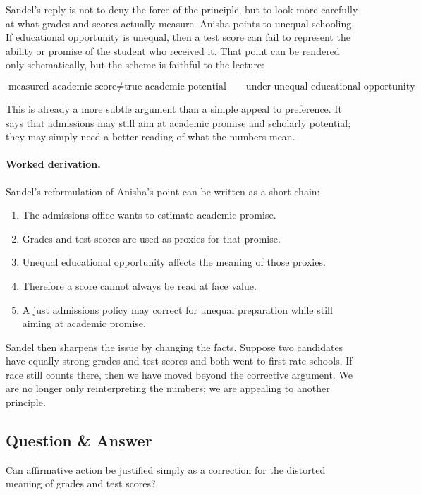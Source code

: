 Sandel's reply is not to deny the force of the principle, but to look more carefully at what grades and scores actually measure. Anisha points to unequal schooling. If educational opportunity is unequal, then a test score can fail to represent the ability or promise of the student who received it. That point can be rendered only schematically, but the scheme is faithful to the lecture:

\begin{equation}
\text{measured academic score} \neq \text{true academic potential}
\qquad
\text{under unequal educational opportunity}
\end{equation}

This is already a more subtle argument than a simple appeal to preference. It says that admissions may still aim at academic promise and scholarly potential; they may simply need a better reading of what the numbers mean.

\paragraph{Worked derivation.} Sandel's reformulation of Anisha's point can be written as a short chain:
\begin{enumerate}
\item The admissions office wants to estimate academic promise.
\item Grades and test scores are used as proxies for that promise.
\item Unequal educational opportunity affects the meaning of those proxies.
\item Therefore a score cannot always be read at face value.
\item A just admissions policy may correct for unequal preparation while still aiming at academic promise.
\end{enumerate}

Sandel then sharpens the issue by changing the facts. Suppose two candidates have equally strong grades and test scores and both went to first-rate schools. If race still counts there, then we have moved beyond the corrective argument. We are no longer only reinterpreting the numbers; we are appealing to another principle.

\subsection{Question \& Answer}

Can affirmative action be justified simply as a correction for the distorted meaning of grades and test scores?

